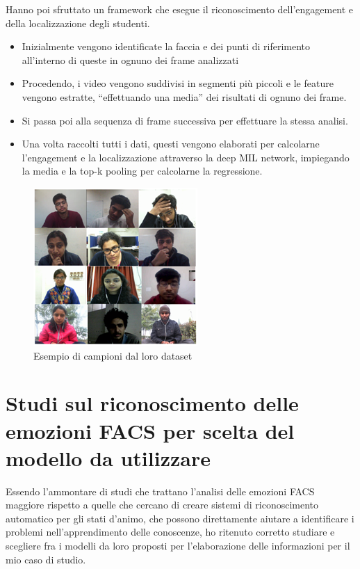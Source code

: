 Hanno poi sfruttato un framework che esegue il riconoscimento dell’engagement e della localizzazione degli studenti.
\begin{itemize}
    \item Inizialmente vengono identificate la faccia e dei punti di riferimento all’interno di queste in ognuno dei frame analizzati 
    \item Procedendo, i video vengono suddivisi in segmenti più piccoli e le feature vengono estratte, “effettuando una media” dei risultati di ognuno dei frame.
    \item Si passa poi alla sequenza di frame successiva per effettuare la stessa analisi.
    \item Una volta raccolti tutti i dati, questi vengono elaborati per calcolarne l’engagement e la localizzazione attraverso la deep MIL network, impiegando la media e la top-k pooling per calcolarne la regressione.
\end{itemize}


\begin{figure}
    \begin{center}    
        \includegraphics[width=0.6\linewidth]{images/4.png}
        \caption{Esempio di campioni dal loro dataset}
    \end{center}
\end{figure}


\section{Studi sul riconoscimento delle emozioni FACS per scelta del modello da utilizzare}
Essendo l’ammontare di studi che trattano l’analisi delle emozioni FACS maggiore rispetto a quelle che cercano di creare sistemi di riconoscimento automatico per gli stati d’animo, che possono direttamente aiutare a identificare i problemi nell’apprendimento delle conoscenze, ho ritenuto corretto studiare e scegliere fra i modelli da loro proposti per l’elaborazione delle informazioni per il mio caso di studio.

